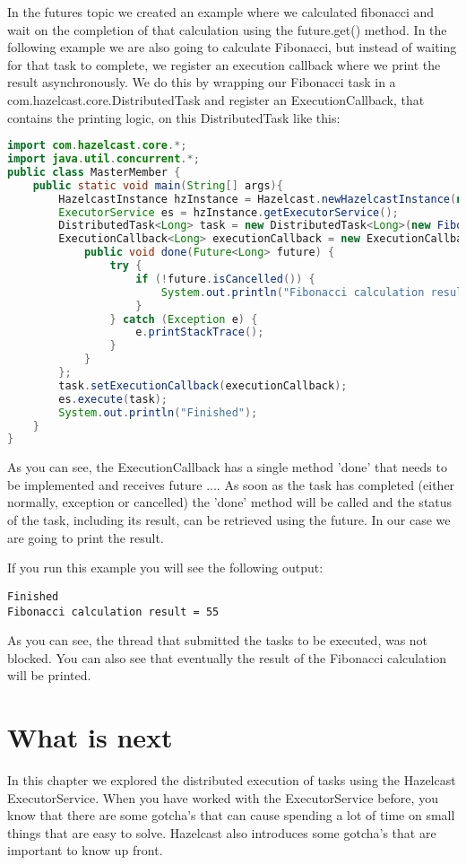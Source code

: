 In the futures topic we created an example where we calculated fibonacci and wait on the completion of that calculation using the future.get() method. In the following example we are also going to calculate Fibonacci, but instead of waiting for that task to complete, we register an execution callback where we print the result asynchronously. We do this by wrapping our Fibonacci task in a com.hazelcast.core.DistributedTask and register an ExecutionCallback, that contains the printing logic, on this DistributedTask like this:
\begin{lstlisting}[language=java]
import com.hazelcast.core.*;
import java.util.concurrent.*;
public class MasterMember {
    public static void main(String[] args){
        HazelcastInstance hzInstance = Hazelcast.newHazelcastInstance(null);
        ExecutorService es = hzInstance.getExecutorService();
        DistributedTask<Long> task = new DistributedTask<Long>(new FibonacciCallable(10));
        ExecutionCallback<Long> executionCallback = new ExecutionCallback<Long>() {
            public void done(Future<Long> future) {
                try {
                    if (!future.isCancelled()) {
                        System.out.println("Fibonacci calculation result = " + future.get());
                    }
                } catch (Exception e) {
                    e.printStackTrace();
                }
            }
        };
        task.setExecutionCallback(executionCallback);
        es.execute(task);
        System.out.println("Finished");
    }
}
\end{lstlisting}
As you can see, the ExecutionCallback has a single method 'done' that needs to be implemented and receives future .... As soon as the task has completed (either normally, exception or cancelled) the 'done' method will be called and the status of the task, including its result, can be retrieved using the future. In our case we are going to print the result.

If you run this example you will see the following output:
\begin{lstlisting}
Finished
Fibonacci calculation result = 55
\end{lstlisting}
As you can see, the thread that submitted the tasks to be executed, was not blocked. You can also see that eventually the result of the Fibonacci calculation will be printed. 

\section{What is next}
In this chapter we explored the distributed execution of tasks using the Hazelcast ExecutorService. When you have worked with the ExecutorService before, you know that there are some gotcha's that can cause spending a lot of time on small things that are easy to solve. Hazelcast also introduces some gotcha's that are important to know up front.

